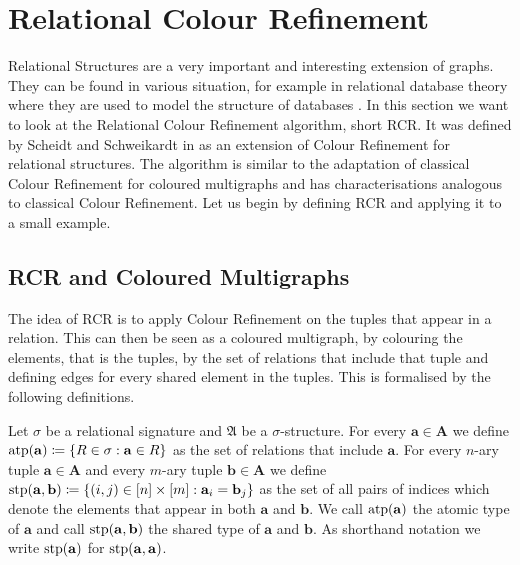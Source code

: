 \section{Relational Colour Refinement}
\label{sec:RelationalColourRefinement}

Relational Structures are a very important and interesting extension of graphs.
They can be found in various situation, for example in relational database theory where they are used to model the structure of databases \cite{abiteboul1996FoundationsDatabases}.
In this section we want to look at the Relational Colour Refinement algorithm, short RCR. 
It was defined by Scheidt and Schweikardt in \cite{scheidt2025ColorRefinement} as an extension of Colour Refinement for relational structures.
The algorithm is similar to the adaptation of classical Colour Refinement for coloured multigraphs and has characterisations analogous to classical Colour Refinement.
Let us begin by defining RCR and applying it to a small example.

\subsection{RCR and Coloured Multigraphs}

The idea of RCR is to apply Colour Refinement on the tuples that appear in a relation.
This can then be seen as a coloured multigraph, by colouring the elements, that is the tuples, by the set of relations that include that tuple and defining edges for every shared element in the tuples.
This is formalised by the following definitions.

\begin{definition}
	Let $\sigma$ be a relational signature and $\mathfrak A$ be a $\sigma$-structure.
	For every $\mathbf a \in \mathbf A$ we define $\operatorname{atp}(\mathbf a)\coloneqq \{R \in \sigma : \mathbf a\in R\}$ as the set of relations that include $\mathbf a$.
	For every $n$-ary tuple $\mathbf a\in \mathbf A$ and every $m$-ary tuple $\mathbf b\in \mathbf A$ we define $\operatorname{stp}(\mathbf a, \mathbf b)\coloneqq\{(i, j) \in [n]\times [m] : \mathbf a_i=\mathbf b_j\}$ as the set of all pairs of indices which denote the elements that appear in both $\mathbf a$ and $\mathbf b$.
	We call $\operatorname{atp}(\mathbf a)$ the atomic type of $\mathbf a$ and call $\operatorname{stp}(\mathbf a,\mathbf b)$ the shared type of $\mathbf a$ and $\mathbf b$.
	As shorthand notation we write $\operatorname{stp}(\mathbf a)$ for $\operatorname{stp}(\mathbf a, \mathbf a)$.
\end{definition}


